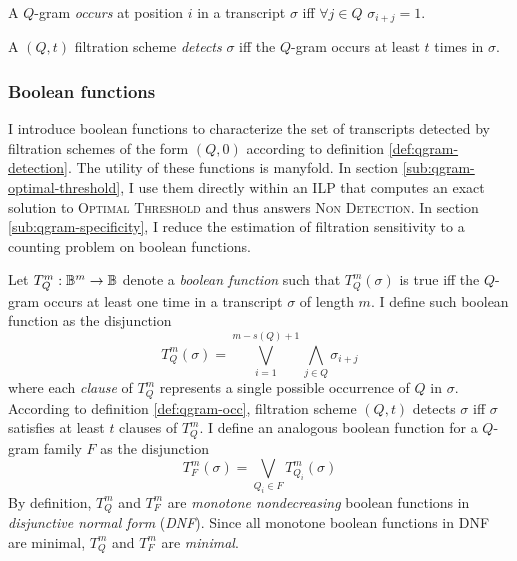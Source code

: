 \begin{definition}
\label{def:qgram-occ}
A $Q$-gram \emph{occurs} at position $i$ in a transcript $\sigma$ iff $\forall j \in Q$ $\sigma_{i+j}=1$.
\end{definition}

\begin{definition}
\label{def:qgram-detection}
A $(Q,t)$ filtration scheme \emph{detects} $\sigma$ iff the $Q$-gram occurs at least $t$ times in $\sigma$.
\end{definition}

\subsubsection{Boolean functions}

I introduce boolean functions to characterize the set of transcripts detected by filtration schemes of the form $(Q,0)$ according to definition \ref{def:qgram-detection}.
The utility of these functions is manyfold.
In section \ref{sub:qgram-optimal-threshold}, I use them directly within an ILP that computes an exact solution to \textsc{Optimal Threshold} and thus answers \textsc{Non Detection}.
In section \ref{sub:qgram-specificity}, I reduce the estimation of filtration sensitivity to a counting problem on boolean functions.

Let $T_{Q}^{m}: \mathbb {B}^m \rightarrow \mathbb {B}$ denote a \emph{boolean function} such that $T_{Q}^{m}(\sigma)$ is true iff the $Q$-gram occurs at least one time in a transcript $\sigma$ of length $m$.
I define such boolean function as the disjunction
\begin{equation}
\label{eq:qgram-bool}
T_{Q}^{m}(\sigma) = \bigvee_{i=1}^{m-s(Q)+1} \bigwedge_{j \in Q} \sigma_{i+j}
\end{equation}
where each \emph{clause} of $T_{Q}^{m}$ represents a single possible occurrence of $Q$ in $\sigma$.
According to definition \ref{def:qgram-occ}, filtration scheme $(Q,t)$ detects $\sigma$ iff $\sigma$ satisfies at least $t$ clauses of $T_{Q}^{m}$.
I define an analogous boolean function for a $Q$-gram family $F$ as the disjunction
\begin{equation}
\label{eq:family-bool}
T_{F}^{m}(\sigma) = \bigvee_{Q_i \in F} T_{Q_i}^{m}(\sigma)
\end{equation}
By definition, $T_{Q}^{m}$ and $T_{F}^{m}$ are \emph{monotone nondecreasing} boolean functions in \emph{disjunctive normal form} (\emph{DNF}).
Since all monotone boolean functions in DNF are minimal, $T_{Q}^{m}$ and $T_{F}^{m}$ are \emph{minimal}.

